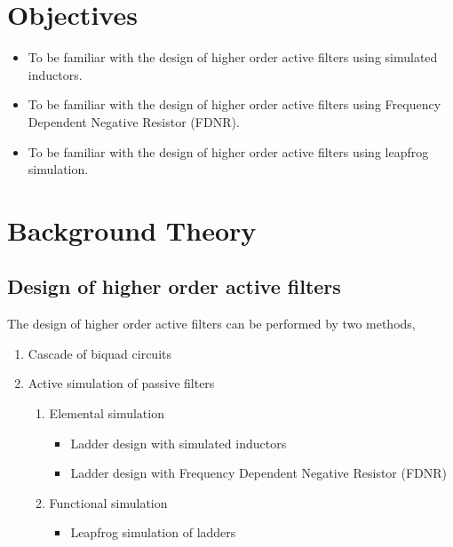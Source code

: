 \documentclass{lab_sheet}
\begin{document}
    \clearpage
    \tableofcontents
    \clearpage
    \listoffigures
    \clearpage
    \section{Objectives}
    \begin{itemize}
        \item To be familiar with the design of higher order active filters using simulated inductors.
        \item To be familiar with the design of higher order active filters using Frequency Dependent Negative Resistor (FDNR).
        \item To be familiar with the design of higher order active filters using leapfrog simulation.
    \end{itemize}
    \section{Background Theory}
    \subsection{Design of higher order active filters}
    The design of higher order active filters can be performed by two methods,
    \begin{enumerate}
        \item Cascade of biquad circuits
        \item Active simulation of passive filters
        \begin{enumerate}
            \item Elemental simulation
            \begin{itemize}
                \item Ladder design with simulated inductors
                \item Ladder design with Frequency Dependent Negative Resistor (FDNR)
            \end{itemize}
            \item Functional simulation
            \begin{itemize}
                \item Leapfrog simulation of ladders
            \end{itemize}
        \end{enumerate}
    \end{enumerate}
\end{document}
